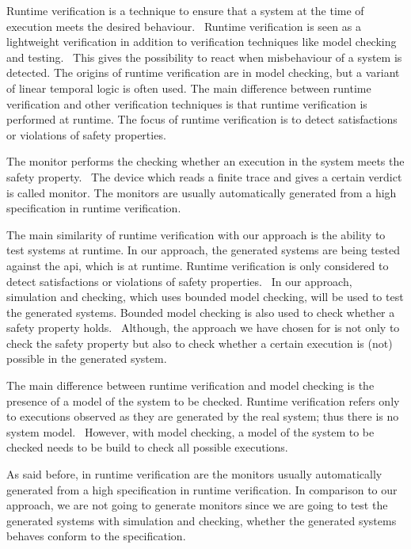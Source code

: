 Runtime verification is a technique to ensure that a system at the time of
execution meets the desired
behaviour.~\cite{leucker2009brief, havelund2008verify, falcone2009runtime}
Runtime verification is seen as a lightweight verification in addition to
verification techniques like model checking and
testing.~\cite[p.~294]{leucker2009brief} This gives the possibility to react
when misbehaviour of a system is detected. The origins of runtime verification
are in model checking, but a variant of linear temporal logic is often used.
The main difference between runtime verification and other verification
techniques is that runtime verification is performed at runtime.
The focus of runtime verification is to detect satisfactions or violations of
safety properties.~\cite{leucker2009brief, falcone2009runtime}

The monitor performs the checking whether an execution in the system meets the
safety property.~\cite[p.~295]{leucker2009brief}
The device which reads a finite trace and gives a certain verdict is called
monitor. The monitors are usually automatically generated from a high
specification in runtime verification.~\cite{leucker2009brief, falcone2009runtime}

The main similarity of runtime verification with our approach is the ability to
test systems at runtime. In our approach, the generated systems are being tested
against the \gls{api}, which is at runtime.
Runtime verification is only considered to detect satisfactions or violations of
safety properties.~\cite{leucker2009brief, falcone2009runtime}
In our approach, simulation and checking, which uses bounded model checking,
will be used to test the generated systems. Bounded model checking is also used
to check whether a safety property holds.~\cite[p.~4]{stoel_storm_vinju_bosman_2016}
Although, the approach we have chosen for is
not only to check the safety property but also to check whether a certain
execution is (not) possible in the generated system.

The main difference between runtime verification and model checking is the
presence of a model of the system to be checked.
Runtime verification refers only to executions observed as they are generated by
the real system; thus there is no system model.~\cite[p.~295]{leucker2009brief}
However, with model checking, a model of the system to be checked needs to be
build to check all possible executions.

As said before, in runtime verification are the monitors usually automatically
generated from a high specification in runtime verification. In comparison to
our approach, we are not going to generate monitors since we are going to test
the generated systems with simulation and checking,
whether the generated systems behaves conform to the specification.

